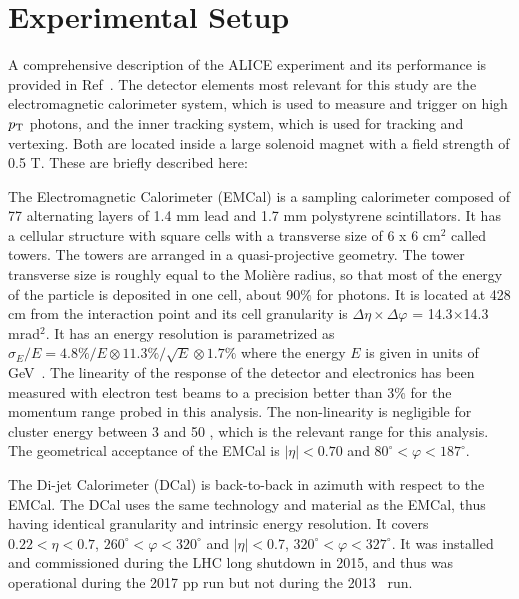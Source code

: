 \section{Experimental Setup}
\label{sec:experimentalsetup}
A comprehensive description of the ALICE experiment and its performance is provided in Ref~\cite{Allen:2010stl,Abelev:2014ffa}. The detector elements most relevant for this study are the electromagnetic calorimeter system, which is used to measure and trigger on high $p_{\mathrm{T}}$ photons, and the inner tracking system, which is used for tracking and vertexing. Both are located inside a large solenoid magnet with a field strength of 0.5 T. These are briefly described here:

The Electromagnetic Calorimeter (EMCal) is a sampling calorimeter composed of 77 alternating layers of {1.4 mm} lead and {1.7 mm} polystyrene scintillators. It has a cellular structure with square cells with a transverse size of 6 x 6 cm$^{2}$ called towers. The towers are arranged in a quasi-projective geometry. The tower transverse size is roughly equal to the Moli\`ere radius, so that most of the energy of the particle is deposited in one cell, about 90$\%$ for photons. It is located at 428 cm from the interaction point and its cell granularity is $\Delta\eta\times\Delta\varphi$ = 14.3$\times$14.3 mrad$^{2}$. It has an energy resolution is parametrized as $\sigma_{E}/E = 4.8\%/E\otimes 11.3\%/\sqrt{E}\otimes 1.7\%$ where the energy $E$ is given in units of GeV~\cite{Abeysekara:2010ze}. The linearity of the response of the detector and electronics has been measured with electron test beams to a precision better than 3$\%$ for the momentum range probed in this analysis. The non-linearity is negligible for cluster energy between 3 and 50 \GeVc, which is the relevant range for this analysis. The geometrical acceptance of the EMCal is $|\eta|<0.70$ and  $80^{\circ} < \varphi < 187^{\circ}$.

The Di-jet Calorimeter (DCal) is back-to-back in azimuth with respect to the EMCal. The DCal uses the same technology and material as the EMCal, thus having identical granularity and intrinsic energy resolution. It covers $0.22< \eta<0.7$, $260^{\circ}< \varphi <320^{\circ}$ and $|\eta|<$0.7, $320^{\circ}<\varphi<327^{\circ}$. It was installed and commissioned during the LHC long shutdown in 2015, and thus was operational during the 2017 pp run but not during the 2013 \pPb~run. %

